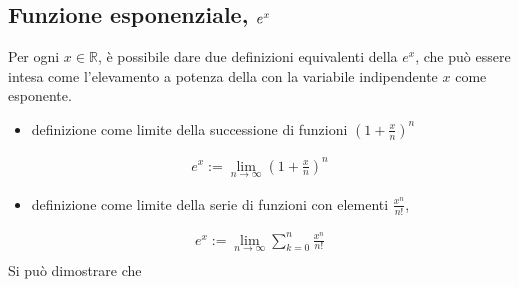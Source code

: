 \documentclass[letterpaper,10pt,italian]{jupyterBook}
\begin{document}
\subsection{Funzione esponenziale, \protect\(e^x\protect\)}
\label{\detokenize{ch/exponential_logarithm:funzione-esponenziale-e-x}}\label{\detokenize{ch/exponential_logarithm:math-hs-exp-def}}
\sphinxAtStartPar
{} Per ogni \(x \in \mathbb{R}\), è possibile dare due definizioni equivalenti della \(e^x\), che può essere intesa come l’elevamento a potenza della {\hyperref[\detokenize{ch/series:math-hs-series-e-euler}]{}} con la variabile indipendente \(x\) come esponente.
\begin{itemize}
\item {} 
\sphinxAtStartPar
definizione come limite della successione di funzioni \(\left( 1 + \frac{x}{n} \right)^n\)

\end{itemize}
\begin{equation*}
\begin{split}
  e^x := \lim_{n \rightarrow \infty} \left( 1 + \frac{x}{n}\right)^n
\end{split}
\end{equation*}\begin{itemize}
\item {} 
\sphinxAtStartPar
definizione come limite della serie di funzioni con elementi \(\frac{x^n}{n!}\),

\end{itemize}
\begin{equation*}
\begin{split}
  e^x := \lim_{n \rightarrow \infty} \sum_{k=0}^{n} \frac{x^n}{n!} \\
\end{split}
\end{equation*}
\sphinxAtStartPar
Si può dimostrare che
\end{document}
